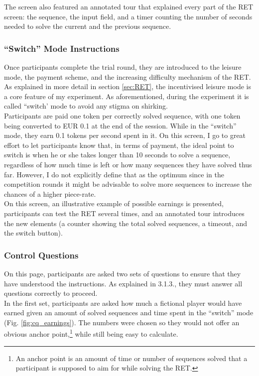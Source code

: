     The screen also featured an annotated tour that explained every part of the RET screen: the sequence, the input field, and a timer counting the number of seconds needed to solve the current and the previous sequence.
    
    \subsubsection{``Switch'' Mode Instructions}
    
    Once participants complete the trial round, they are introduced to the leisure mode, the payment scheme, and the increasing difficulty mechanism of the RET. As explained in more detail in section \ref{sec:RET}, the incentivised leisure mode is a core feature of my experiment. As aforementioned, during the experiment it is called ``switch' mode to avoid any stigma on shirking.\\
    
    Participants are paid one token per correctly solved sequence, with one token being converted to EUR 0.1 at the end of the session. While in the ``switch'' mode, they earn 0.1 tokens per second spent in it. On this screen, I go to great effort to let participants know that, in terms of payment, the ideal point to switch is when he or she takes longer than 10 seconds to solve a sequence, regardless of how much time is left or how many sequences they have solved thus far. However, I do not explicitly define that as the optimum since in the competition rounds it might be advisable to solve more sequences to increase the chances of a higher piece-rate.\\
    
    On this screen, an illustrative example of possible earnings is presented, participants can test the RET several times, and an annotated tour introduces the new elements (a counter showing the total solved sequences, a timeout, and the switch button).
    
    \subsubsection{Control Questions}
    
    On this page, participants are asked two sets of questions to ensure that they have understood the instructions. As explained in 3.1.3., they must answer all questions correctly to proceed.\\
    
    In the first set, participants are asked how much a fictional player would have earned given an amount of solved sequences and time spent in the ``switch'' mode (Fig. \ref{fig:cq_earnings}). The numbers were chosen so they would not offer an obvious anchor point,\footnote{An anchor point is an amount of time or number of sequences solved that a participant is supposed to aim for while solving the RET.} while still being easy to calculate.\\
    
